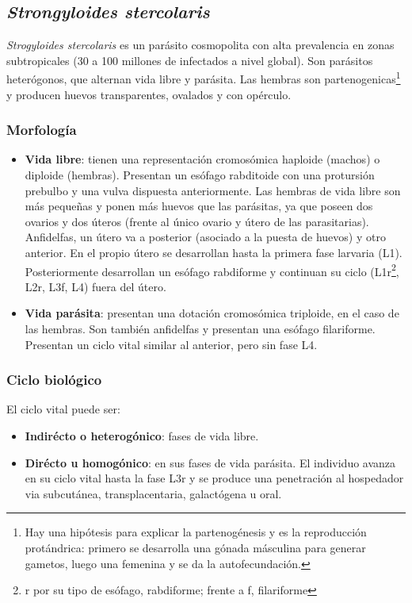 \subsection{\textit{Strongyloides stercolaris}}
\textit{Strogyloides stercolaris} es un parásito cosmopolita con alta prevalencia en zonas subtropicales (30 a 100 millones de infectados a nivel global). Son parásitos heterógonos, que alternan vida libre y parásita. Las hembras son partenogenicas\footnote{Hay una hipótesis para explicar la partenogénesis y es la reproducción protándrica: primero se desarrolla una gónada másculina para generar gametos, luego una femenina y se da la autofecundación.} y producen huevos transparentes, ovalados y con opérculo.
\subsubsection{Morfología}
\begin{itemize}[itemsep=0pt,parsep=0pt,topsep=0pt,partopsep=0pt]
	\item \textbf{Vida libre}: tienen una representación cromosómica haploide (machos) o diploide (hembras). Presentan un esófago rabditoide con una protursión prebulbo y una vulva dispuesta anteriormente. Las hembras de vida libre son más pequeñas y ponen más huevos que las parásitas, ya que poseen dos ovarios y dos úteros (frente al único ovario y útero de las parasitarias). Anfidelfas, un útero va a posterior (asociado a la puesta de huevos) y otro anterior. En el propio útero se desarrollan hasta la primera fase larvaria (L1). Posteriormente desarrollan un esófago rabdiforme y continuan su ciclo (L1r\footnote{r por su tipo de esófago, rabdiforme; frente a f, filariforme}, L2r, L3f, L4) fuera del útero.
	\item \textbf{Vida parásita}: presentan una dotación cromosómica triploide, en el caso de las hembras. Son también anfidelfas y presentan una esófago filariforme. Presentan un ciclo vital similar al anterior, pero sin fase L4.
\end{itemize}
\subsubsection{Ciclo biológico}
El ciclo vital puede ser:
\begin{itemize}[itemsep=0pt,parsep=0pt,topsep=0pt,partopsep=0pt]
	\item \textbf{Indirécto o heterogónico}: fases de vida libre.
	\item \textbf{Dirécto u homogónico}: en sus fases de vida parásita. El individuo avanza en su ciclo vital hasta la fase L3r y se produce una penetración al hospedador via subcutánea, transplacentaria, galactógena u oral.
\end{itemize}

